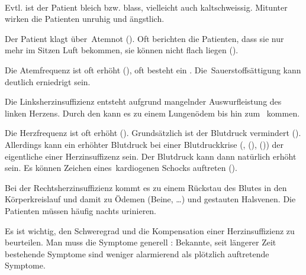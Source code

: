 \TextSlide
{\TxABCDE}
{~
\label{topic:linksherzinsuffizienz}%
%
%
%
\label{topic:rechtsherzinsuffizienz}%
%
%
%
\begin{ABCDEText}
  \item[\ABCDE{2}] Evtl. ist der Patient bleich bzw.
  blass, vielleicht auch kaltschweissig. Mitunter wirken die
  Patienten unruhig und ängstlich.
  \item[\ABCDE{4}] Der Patient klagt über {\RedFlag}\,Atemnot (). 
  Oft berichten
  die Patienten, dass sie nur mehr im Sitzen Luft bekommen,
  sie können nicht flach liegen
  ().
  \item[\ABCDE{B}] Die Atemfrequenz ist
  oft erhöht (), oft besteht ein . Die
  {\RedFlag}\,Sauerstoffsättigung kann deutlich erniedrigt sein.
  
  Die Linksherzinsuffizienz entsteht aufgrund mangelnder
  Auswurfleistung des linken Herzens. Durch den  kann es zu einem Lungenödem bis hin zum
  {\RedFlag}\, kommen. 
  \item[\ABCDE{C}] Die Herzfrequenz ist
  oft erhöht (). 
  Grundsätzlich ist der Blutdruck vermindert ().
  Allerdings kann ein erhöhter Blutdruck bei einer
  Blutdruckkrise (, 
  (),  ()) der
  eigentliche  einer Herzinsuffizenz sein. Der
  Blutdruck
  kann dann natürlich erhöht sein.
  Es können Zeichen eines {\RedFlag}\,kardiogenen
  Schocks auftreten
  ().
  \item[\ABCDE{\ldots}]
  Bei der Rechtsherzinsuffizienz kommt
  es zu einem Rückstau des Blutes in den Körperkreislauf und
  damit zu Ödemen (Beine, \ldots) und gestauten Halsvenen.
  Die Patienten müssen häufig nachts urinieren. 
  \item[\ABCDE{=}] Es ist wichtig, den Schweregrad und die Kompensation einer
  Herzinsuffizienz zu beurteilen. Man muss die Symptome generell : Bekannte, seit längerer Zeit
  bestehende Symptome sind weniger alarmierend als plötzlich
  auftretende Symptome. 
  

\end{ABCDEText}}

